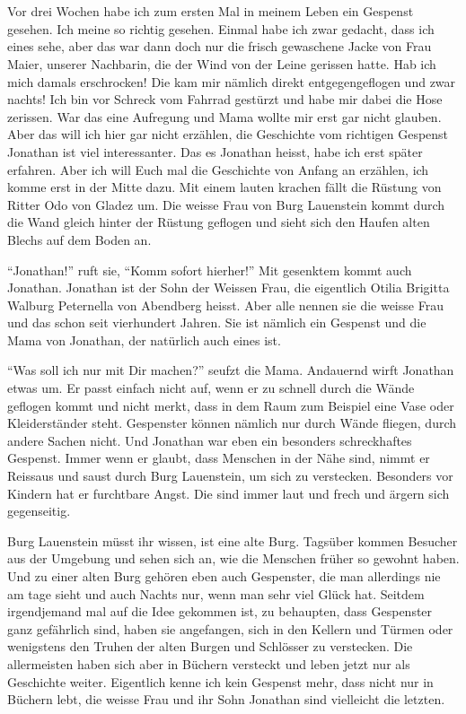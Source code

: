 \chapter*{}
\begin{mdframed}[style=mystyle]
\lettrine[lines=3]{\color{red}V}{}or drei Wochen habe ich zum ersten Mal in meinem Leben ein Gespenst gesehen. Ich meine so richtig gesehen. Einmal habe ich zwar gedacht, dass ich eines sehe, aber das war dann doch nur die frisch gewaschene Jacke von Frau Maier, unserer Nachbarin, die der Wind von der Leine gerissen hatte. Hab ich mich damals erschrocken! Die kam mir nämlich direkt entgegengeflogen und zwar nachts! Ich bin vor Schreck vom Fahrrad gestürzt und habe mir dabei die Hose zerissen.  War das eine Aufregung und Mama wollte mir erst gar nicht glauben. Aber das will ich hier gar nicht erzählen, die Geschichte vom richtigen Gespenst Jonathan ist viel interessanter.  Das es Jonathan heisst, habe ich erst später erfahren. Aber ich will Euch mal die Geschichte von Anfang an erzählen, ich komme erst in der Mitte dazu.
 Mit einem lauten krachen fällt die Rüstung von Ritter Odo von Gladez um. Die weisse Frau von Burg Lauenstein kommt durch die Wand gleich hinter der Rüstung geflogen und sieht sich den Haufen alten Blechs auf dem Boden an.
\end{mdframed}\medskip
\enquote{Jonathan!} ruft sie, \enquote{Komm sofort hierher!} Mit gesenktem kommt auch Jonathan. Jonathan ist der Sohn der Weissen Frau, die eigentlich Otilia Brigitta Walburg Peternella von Abendberg heisst. Aber alle nennen sie die weisse Frau und das schon seit vierhundert Jahren. Sie ist nämlich ein Gespenst und die Mama von Jonathan, der natürlich auch eines ist. 

\enquote{Was soll ich nur mit Dir machen?} seufzt die Mama. Andauernd wirft Jonathan etwas um. Er passt einfach nicht auf, wenn er zu schnell durch die Wände geflogen kommt und nicht merkt, dass in dem Raum zum Beispiel eine Vase oder Kleiderständer steht. Gespenster können nämlich nur durch Wände fliegen, durch andere Sachen nicht. Und Jonathan war eben ein besonders schreckhaftes Gespenst. Immer wenn er glaubt, dass Menschen in der Nähe sind, nimmt er Reissaus und saust durch Burg Lauenstein, um sich zu verstecken. Besonders vor Kindern hat er furchtbare Angst. Die sind immer laut und frech und ärgern sich gegenseitig. 

Burg Lauenstein müsst ihr wissen, ist eine alte Burg. Tagsüber kommen Besucher aus der Umgebung und sehen sich an, wie die Menschen früher so gewohnt haben. Und zu einer alten Burg gehören eben auch Gespenster, die man allerdings nie am tage sieht und auch Nachts nur, wenn man sehr viel Glück hat. Seitdem irgendjemand mal auf die Idee gekommen ist, zu behaupten, dass Gespenster ganz gefährlich sind, haben sie angefangen, sich in den Kellern und Türmen oder wenigstens den Truhen der alten Burgen und Schlösser zu verstecken. Die allermeisten haben sich aber in Büchern versteckt und leben jetzt nur als Geschichte weiter. Eigentlich kenne ich kein Gespenst mehr, dass nicht nur in Büchern lebt, die weisse Frau und ihr Sohn Jonathan sind vielleicht die letzten.



